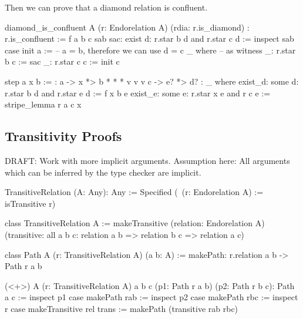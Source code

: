 Then we can prove that a diamond relation is confluent.

\begin{alba}
  diamond_is_confluent
    A
    (r: Endorelation A)
    (rdia: r.is_diamond)
    : r.is_confluent
    :=
      f a b c sab sac: exist d: r.star b d and r.star c d :=
        inspect sab case
          init a :=            -- a = b, therefore we can use d = c
            _ where            --        as witness
              _: r.star b c := sac
              _: r.star c c := init c

          step a x b :=
            {:  a  ->  x  *>  b
                *      *      *
                v      v      v
                c  ->  e? *>  d? :}
            _ where
              exist_d: some d: r.star b d and r.star e d := f x b e
              exist_e: some e: r.star x e and r c e := stripe_lemma r a c x

\end{alba}



\vskip 5mm
\subsection{Transitivity Proofs}

DRAFT: Work with more implicit arguments. Assumption here: All arguments which
can be inferred by the type checker are implicit.



\begin{alba}
    TransitiveRelation (A: Any): Any :=
        Specified (\ (r: Endorelation A) := isTransitive r)

    class
        TransitiveRelation A
    :=
        makeTransitive
            (relation: Endorelation A)
            (transitive:
                all a b c:
                    relation a b => relation b c => relation a c)

    class
        Path A (r: TransitiveRelation A) (a b: A)
    :=
        makePath: r.relation a b -> Path r a b


    (<+>)
        A (r: TransitiveRelation A) a b c
        (p1: Path r a b)
        (p2: Path r b c):
        Path a c
    :=
        inspect p1 case
            makePath rab :=
                inspect p2 case
                    makePath rbc :=
                        inspect r case
                            makeTransitive rel trans :=
                                makePath
                                    (transitive rab rbc)

\end{alba}












